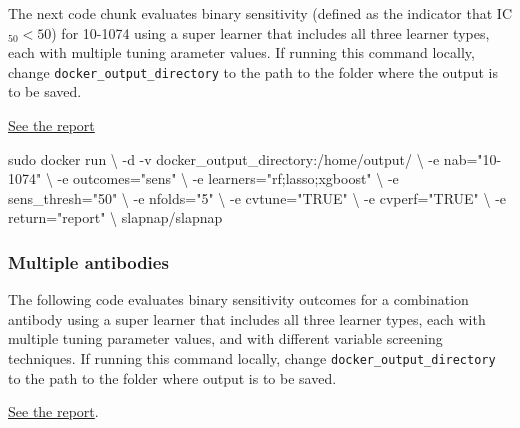 \documentclass[]{article}
\newenvironment{Shaded}{\begin{snugshade}}{\end{snugshade}}
\newcommand{\StringTok}[1]{\textcolor[rgb]{0.31,0.60,0.02}{#1}}
\newcommand{\FunctionTok}[1]{\textcolor[rgb]{0.00,0.00,0.00}{#1}}
\newcommand{\ExtensionTok}[1]{#1}
\newcommand{\NormalTok}[1]{#1}
\begin{document}
The next code chunk evaluates binary sensitivity (defined as the
indicator that IC\(_{50} < 50\)) for 10-1074 using a super learner that
includes all three learner types, each with multiple tuning arameter
values. If running this command locally, change
\texttt{docker\_output\_directory} to the path to the folder where the
output is to be saved.

\href{reports/report_10-1074.html}{See the report}

\begin{Shaded}
\begin{Highlighting}[]
\FunctionTok{sudo}\NormalTok{ docker run \textbackslash{}}
\NormalTok{    -d}
    \ExtensionTok{-v}\NormalTok{ docker_output_directory:/home/output/ \textbackslash{}}
\NormalTok{    -e nab=}\StringTok{"10-1074"}\NormalTok{ \textbackslash{}}
\NormalTok{    -e outcomes=}\StringTok{"sens"}\NormalTok{ \textbackslash{}}
\NormalTok{    -e learners=}\StringTok{"rf;lasso;xgboost"}\NormalTok{ \textbackslash{}}
\NormalTok{    -e sens_thresh=}\StringTok{"50"}\NormalTok{ \textbackslash{}}
\NormalTok{    -e nfolds=}\StringTok{"5"}\NormalTok{ \textbackslash{}}
\NormalTok{    -e cvtune=}\StringTok{"TRUE"}\NormalTok{ \textbackslash{}}
\NormalTok{    -e cvperf=}\StringTok{"TRUE"}\NormalTok{ \textbackslash{}}
\NormalTok{    -e return=}\StringTok{"report"}\NormalTok{ \textbackslash{}}
\NormalTok{    slapnap/slapnap}
\end{Highlighting}
\end{Shaded}

\subsubsection{Multiple antibodies}\label{multiple-antibodies}

The following code evaluates binary sensitivity outcomes for a
combination antibody using a super learner that includes all three
learner types, each with multiple tuning parameter values, and with
different variable screening techniques. If running this command
locally, change \texttt{docker\_output\_directory} to the path to the
folder where output is to be saved.

\href{reports/report_10-1074_pg9.html}{See the report}.
\end{document}
